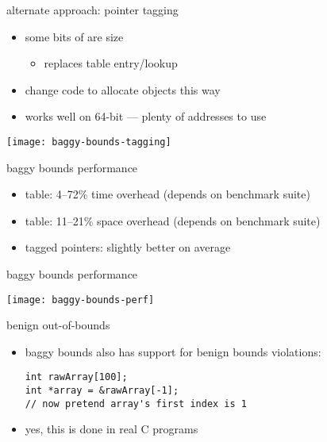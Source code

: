 \begin{frame}{alternate approach: pointer tagging}
    \begin{itemize}
        \item some bits of  are size 
        \begin{itemize}
        \item replaces table entry/lookup
        \end{itemize}
    \item change code to allocate objects this way
    \item works well on 64-bit --- plenty of addresses to use
    \end{itemize}
    \texttt{[image: baggy-bounds-tagging]}
\end{frame}

\begin{frame}{baggy bounds performance}
    \begin{itemize}
        \item table: 4--72\% time overhead (depends on benchmark suite)
        \item table: 11--21\% space overhead (depends on benchmark suite)
        \item tagged pointers: slightly better on average
    \end{itemize}
\end{frame}

\begin{frame}{baggy bounds performance}
    \begin{center}
    \texttt{[image: baggy-bounds-perf]}
    \end{center}
\end{frame}

\begin{frame}[fragile,label=bbNit]{benign out-of-bounds}
\lstset{language=C,style=small}
    \begin{itemize}
        \item baggy bounds also has support for benign bounds violations:
\begin{lstlisting}
int rawArray[100];
int *array = &rawArray[-1];
// now pretend array's first index is 1
\end{lstlisting}
        \item yes, this is done in real C programs
    \end{itemize}
\end{frame}

